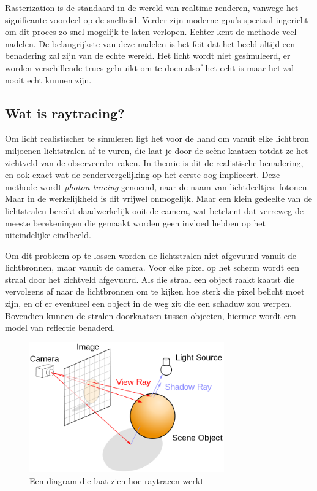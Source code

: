 \documentclass[12pt, a4paper]{article}
\begin{document}
Rasterization is de standaard in de wereld van realtime renderen, vanwege het significante voordeel op de snelheid. Verder zijn moderne gpu's speciaal ingericht om dit proces zo snel mogelijk te laten verlopen. \cite{10.1145/2018323.2018337}
 Echter kent de methode veel nadelen. De belangrijkste van deze nadelen is het feit dat het beeld altijd een benadering zal zijn van de echte wereld. Het licht wordt niet gesimuleerd, er worden verschillende trucs gebruikt om te doen alsof het echt is maar het zal nooit echt kunnen zijn. 
\subsection{Wat is raytracing?}

Om licht realistischer te simuleren ligt het voor de hand om vanuit elke lichtbron miljoenen lichtstralen af te vuren, die laat je door de scène kaatsen totdat ze het zichtveld van de observeerder raken. In theorie is dit de realistische benadering, en ook exact wat de rendervergelijking op het eerste oog impliceert. Deze methode wordt \emph{photon tracing} genoemd, naar de naam van lichtdeeltjes: fotonen. Maar in de werkelijkheid is dit vrijwel onmogelijk. Maar een klein gedeelte van de lichtstralen bereikt daadwerkelijk ooit de camera, wat betekent dat verreweg de meeste berekeningen die gemaakt worden geen invloed hebben op het uiteindelijke eindbeeld. 

Om dit probleem op te lossen worden de lichtstralen niet afgevuurd vanuit de lichtbronnen, maar vanuit de camera. Voor elke pixel op het scherm wordt een straal door het zichtveld afgevuurd. Als die straal een object raakt kaatst die vervolgens af naar de lichtbronnen om te kijken hoe sterk die pixel belicht moet zijn, en of er eventueel een object in de weg zit die een schaduw zou werpen. Bovendien kunnen de stralen doorkaatsen tussen objecten, hiermee wordt een model van reflectie benaderd. 

\begin{figure}[H]
    \centering
    \includegraphics[width=0.75\textwidth]{raytracing_diagram.png}
    \caption{Een diagram die laat zien hoe raytracen werkt}
    \label{fig:raytracing_diagram}
\end{figure}
\end{document}
